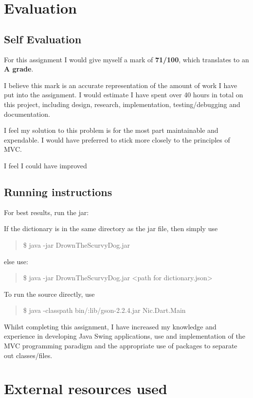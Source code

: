 \documentclass[a4paper, 11pt]{article}
\begin{document}
\section{Evaluation}

\subsection{Self Evaluation}

For this assignment I would give myself a mark of \textbf{71/100}, which translates to an \textbf{A grade}.

I believe this mark is an accurate representation of the amount of work I have put into the assignment. I would estimate I have spent over 40 hours in total on this project, including design, research, implementation, testing/debugging and documentation.

I feel my solution to this problem is for the most part maintainable and expendable. I would have preferred to stick more closely to the principles of MVC. 

I feel I could have improved 

\subsection{Running instructions}

For best results, run the jar:

If the dictionary is in the same directory as the jar file, then simply use
\begin{quote}
\$ java -jar DrownTheScurvyDog.jar
\end{quote}

else use:
\begin{quote}
\$ java -jar DrownTheScurvyDog.jar \textless path for dictionary.json\textgreater
\end{quote}

To run the source directly, use
\begin{quote}
\$ java -classpath bin/:lib/gson-2.2.4.jar Nic.Dart.Main
\end{quote}




\vspace{\baselineskip}

Whilst completing this assignment, I have increased my knowledge and experience in developing Java Swing applications, use and implementation of the MVC programming paradigm and the appropriate use of packages to separate out classes/files.
\section{External resources used}
\end{document}

